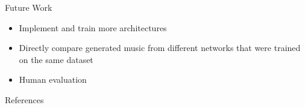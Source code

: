 \documentclass[final,hyperref={pdfpagelabels=false}]{beamer}
\newcommand{\blocktextwidth}{0.93\textwidth}
\begin{document}
\begin{frame}[t]
\begin{columns}[t]
\begin{column}{0.6375\textwidth}
\begin{columns}[T]
\begin{column}{0.486\textwidth}
\begin{block}{Future Work}
\begin{minipage}[]{\blocktextwidth}
\begin{itemize}[leftmargin=*,labelindent=0pt,label={\color{black!40}$\bullet$}]
\item{Implement and train more architectures}
\item{Directly compare generated music from different networks that were trained on the same dataset}
\item{Human evaluation}
\end{itemize}
\end{minipage}
\end{block}







\vspace{1em}
{

\begin{block}{References}
\vspace{-.5\baselineskip}

\scriptsize{}
\end{block}
}



\end{column}
\end{columns}


\end{column} %
\end{columns} %



\end{frame} %
\end{document}
